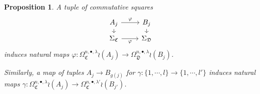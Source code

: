 \documentclass[a4paper,10pt
,draft
]{article}%
\numberwithin{equation}{section}
\numberwithin{figure}{section}
\newtheorem{proposition}[equation]{Proposition}%
\theoremstyle{definition} %
\newcommand{\1}{\ensuremath{\mathbbm 1}}%
\begin{document}
\begin{proposition}\label{SPANPIECEJ PROP}
	A tuple of commutative squares
	\begin{equation}\label{SPANPIECEJ EQ}
	\begin{tikzcd}[row sep = 6pt]
	A_j \ar{d} \ar{r}{\varphi} &  \ar{d} B_j
	\\
	\Sigma_{\mathfrak{C}} \ar{r}[swap]{\varphi} & \Sigma_{\mathfrak{D}}
	\end{tikzcd}
	\end{equation}
	induces natural maps 
	$\varphi \colon
	\Omega_{\mathfrak{C}}^{n,\bullet,\lambda} \wr (A_j) \to 
	\Omega_{\mathfrak{D}}^{n,\bullet,\lambda} \wr (B_j) $.
	
	Similarly, a map of tuples $A_j \to B_{g(j)}$ for 
	$\gamma \colon \{1,\cdots,l\} \to \{1,\cdots,l'\}$
	induces natural maps 
	$\gamma \colon
	\Omega_{\mathfrak{C}}^{n,\bullet,\lambda} \wr (A_j) \to 
	\Omega_{\mathfrak{C}}^{n,\bullet,\lambda'} \wr (B_{j'}) $.
	

\end{proposition}
\end{document}
